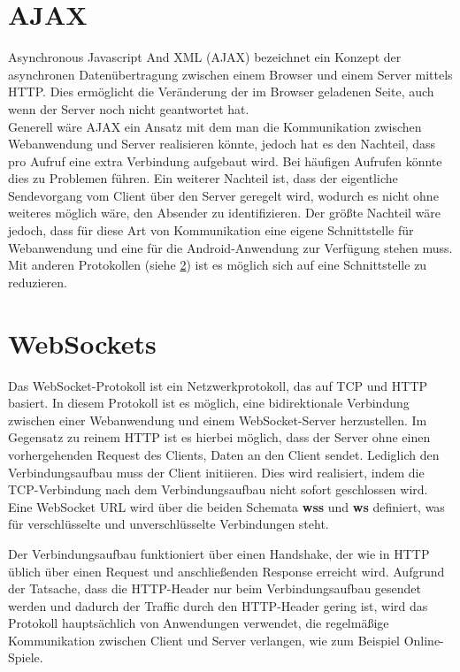 \section{AJAX}
Asynchronous Javascript And XML (AJAX) bezeichnet ein Konzept der asynchronen Datenübertragung zwischen einem Browser und einem Server mittels HTTP. Dies ermöglicht die Veränderung der im Browser geladenen Seite, auch wenn der Server noch nicht geantwortet hat. \\
Generell wäre AJAX ein Ansatz mit dem man die Kommunikation zwischen Webanwendung und Server realisieren könnte, jedoch hat es den Nachteil, dass pro Aufruf eine extra Verbindung aufgebaut wird. Bei häufigen Aufrufen könnte dies zu Problemen führen. Ein weiterer Nachteil ist, dass der eigentliche Sendevorgang vom Client über den Server geregelt wird, wodurch es nicht ohne weiteres möglich wäre, den Absender zu identifizieren. Der größte Nachteil wäre jedoch, dass für diese Art von Kommunikation eine eigene Schnittstelle für Webanwendung und eine für die Android-Anwendung zur Verfügung stehen muss. Mit anderen Protokollen (siehe \ref{sec:websockets}) ist es möglich sich auf eine Schnittstelle zu reduzieren.


\section{WebSockets}
\label{sec:websockets}
Das WebSocket-Protokoll ist ein Netzwerkprotokoll, das auf TCP und HTTP basiert. In diesem Protokoll ist es möglich, eine bidirektionale Verbindung zwischen einer Webanwendung und einem WebSocket-Server herzustellen. Im Gegensatz zu reinem HTTP ist es hierbei möglich, dass der Server ohne einen vorhergehenden Request des Clients, Daten an den Client sendet. Lediglich den Verbindungsaufbau muss der Client initiieren. Dies wird realisiert, indem die TCP-Verbindung nach dem Verbindungsaufbau nicht sofort geschlossen wird. 
Eine WebSocket URL wird über die beiden Schemata \textbf{wss} und \textbf{ws} definiert, was für verschlüsselte und unverschlüsselte Verbindungen steht.

Der Verbindungsaufbau funktioniert über einen Handshake, der wie in HTTP üblich über einen Request und anschließenden Response erreicht wird. Aufgrund der Tatsache, dass die HTTP-Header nur beim Verbindungsaufbau gesendet werden und dadurch der Traffic durch den HTTP-Header gering ist, wird das Protokoll hauptsächlich von Anwendungen verwendet, die regelmäßige Kommunikation zwischen Client und Server verlangen, wie zum Beispiel Online-Spiele. \\

